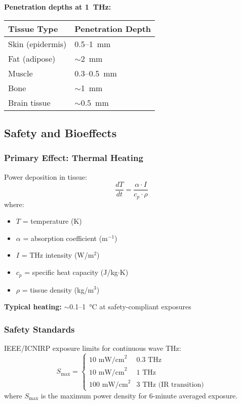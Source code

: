 \textbf{Penetration depths at 1~THz:}

\begin{center}
\begin{tabular}{@{}ll@{}}
\toprule
Tissue Type & Penetration Depth \\
\midrule
Skin (epidermis) & 0.5--1~mm \\
Fat (adipose) & $\sim$2~mm \\
Muscle & 0.3--0.5~mm \\
Bone & $\sim$1~mm \\
Brain tissue & $\sim$0.5~mm \\
\bottomrule
\end{tabular}
\end{center}

\subsection{Safety and Bioeffects}

\subsubsection{Primary Effect: Thermal Heating}

Power deposition in tissue:
\begin{equation}
\frac{dT}{dt} = \frac{\alpha \cdot I}{c_p \cdot \rho}
\end{equation}
where:
\begin{itemize}
\item $T$ = temperature (K)
\item $\alpha$ = absorption coefficient (m$^{-1}$)
\item $I$ = THz intensity (W/m$^2$)
\item $c_p$ = specific heat capacity (J/kg$\cdot$K)
\item $\rho$ = tissue density (kg/m$^3$)
\end{itemize}

\textbf{Typical heating:} $\sim$0.1--1~°C at safety-compliant exposures

\subsubsection{Safety Standards}

IEEE/ICNIRP exposure limits for continuous wave THz:
\begin{equation}
S_{\text{max}} = \begin{cases}
10 \text{ mW/cm}^2 & 0.3 \text{ THz} \\
10 \text{ mW/cm}^2 & 1 \text{ THz} \\
100 \text{ mW/cm}^2 & 3 \text{ THz (IR transition)}
\end{cases}
\end{equation}
where $S_{\text{max}}$ is the maximum power density for 6-minute averaged exposure.

